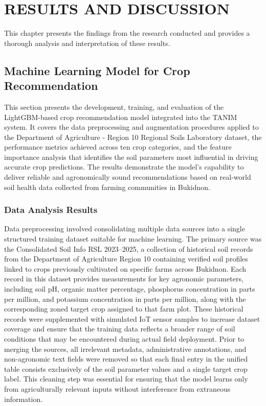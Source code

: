 \chapter{RESULTS AND DISCUSSION}
{\baselineskip
	
	This chapter presents the findings from the research conducted and provides a thorough analysis and interpretation of these results.
	
	\section{Machine Learning Model for Crop Recommendation}
	
	This section presents the development, training, and evaluation of the LightGBM-based crop recommendation model integrated into the TANIM system. It covers the data preprocessing and augmentation procedures applied to the Department of Agriculture - Region 10 Regional Soils Laboratory dataset, the performance metrics achieved across ten crop categories, and the feature importance analysis that identifies the soil parameters most influential in driving accurate crop predictions. The results demonstrate the model's capability to deliver	reliable and agronomically sound recommendations based on real-world soil health data collected from farming communities in Bukidnon.
	
	\subsection{Data Analysis Results}
	
	Data preprocessing involved consolidating multiple data sources into a single structured training dataset suitable for machine learning. The primary source was the Consolidated Soil Info RSL 2023--2025, a collection of historical soil records from the Department of Agriculture Region 10 containing verified soil profiles linked to crops previously cultivated on specific farms across Bukidnon. Each record in this dataset provides measurements for key agronomic parameters, including soil pH, organic matter percentage, phosphorus concentration in parts per million, and potassium concentration in parts per million, along with the corresponding zoned target crop assigned to that farm plot. These historical records were supplemented with simulated IoT sensor samples to increase dataset coverage and ensure that the training data reflects a broader range of soil conditions that may be encountered during actual field deployment. Prior to merging the sources, all irrelevant metadata, administrative annotations, and non-agronomic text fields were removed so that each final entry in the unified table consists exclusively of the soil parameter values and a single target crop label. This cleaning step was essential for ensuring that the model learns only from agriculturally relevant inputs without interference from extraneous information.
	
}
